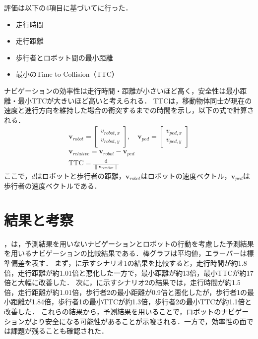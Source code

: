 評価は以下の4項目に基づいてに行った．
\begin{itemize}
  \item 走行時間
  \item 走行距離
  \item 歩行者とロボット間の最小距離
  \item 最小のTime to Collision（TTC）
\end{itemize}
ナビゲーションの効率性は走行時間・距離が小さいほど高く，安全性は最小距離・最小TTCが大きいほど高いと考えられる．
TTCは，移動物体同士が現在の速度と進行方向を維持した場合の衝突するまでの時間を示し，以下の式で計算される．
\setlength{\jot}{1em}
\begin{align}
  \mathbf{v}_{robot} = \begin{bmatrix} v_{robot,x} \\ v_{robot,y} \end{bmatrix}, \quad 
  \mathbf{v}_{ped} = \begin{bmatrix} v_{ped,x} \\ v_{ped,y} \end{bmatrix} \\
  \mathbf{v}_{relative} = \mathbf{v}_{robot} - \mathbf{v}_{ped} \\
  \text{TTC} = \frac{\text{d}}{\|\mathbf{v}_{relative}\|}
\end{align}
ここで，$d$はロボットと歩行者の距離，$\mathbf{v}_{robot}$はロボットの速度ベクトル，$\mathbf{v}_{ped}$は歩行者の速度ベクトルである．

\section{結果と考察}
，は，予測結果を用いないナビゲーションとロボットの行動を考慮した予測結果を用いるナビゲーションの比較結果である．棒グラフは平均値，エラーバーは標準偏差を表す．
まず，に示すシナリオ1の結果を比較すると，走行時間が約1.8倍，走行距離が約1.01倍と悪化した一方で，最小距離が約13倍，最小TTCが約17倍と大幅に改善した．
次に，に示すシナリオ2の結果では，走行時間が約1.5倍，走行距離が約1.01倍，歩行者2の最小距離が0.9倍と悪化したが，歩行者1の最小距離が1.84倍，歩行者1の最小TTCが約1.3倍，歩行者2の最小TTCが約1.1倍と改善した．
これらの結果から，予測結果を用いることで，ロボットのナビゲーションがより安全になる可能性があることが示唆される．一方で，効率性の面では課題が残ることも確認された．

